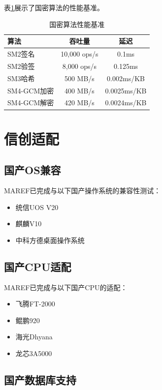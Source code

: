 表\ref{tab:crypto}展示了国密算法的性能基准。

\begin{table}[htbp]
\caption{国密算法性能基准}
\label{tab:crypto}
\begin{tabular}{lcc}
\toprule
\textbf{算法} & \textbf{吞吐量} & \textbf{延迟} \\
\midrule
SM2签名 & 10,000 ops/s & 0.1ms \\
SM2验签 & 8,000 ops/s & 0.125ms \\
SM3哈希 & 500 MB/s & 0.002ms/KB \\
SM4-GCM加密 & 400 MB/s & 0.0025ms/KB \\
SM4-GCM解密 & 420 MB/s & 0.0024ms/KB \\
\bottomrule
\end{tabular}
\end{table}

\section{信创适配}

\subsection{国产OS兼容}

MAREF已完成与以下国产操作系统的兼容性测试：

\begin{itemize}
    \item 统信UOS V20
    \item 麒麟V10
    \item 中科方德桌面操作系统
\end{itemize}

\subsection{国产CPU适配}

MAREF已完成与以下国产CPU的适配：

\begin{itemize}
    \item 飞腾FT-2000
    \item 鲲鹏920
    \item 海光Dhyana
    \item 龙芯3A5000
\end{itemize}

\subsection{国产数据库支持}

